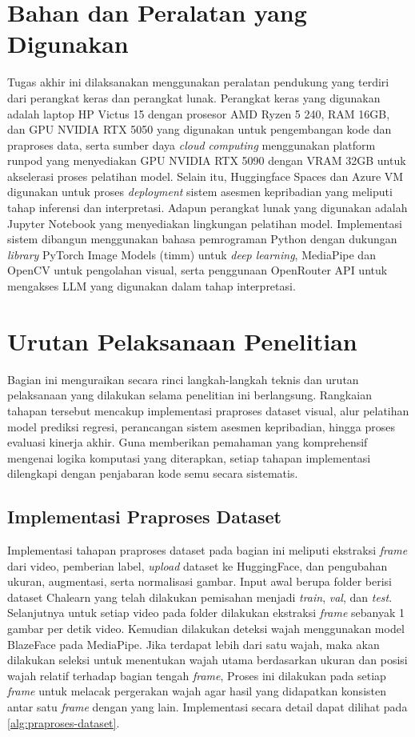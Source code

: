 \section{Bahan dan Peralatan yang Digunakan}

Tugas akhir ini dilaksanakan menggunakan peralatan pendukung yang terdiri dari perangkat keras dan perangkat lunak. Perangkat keras yang digunakan adalah laptop HP Victus 15 dengan prosesor AMD Ryzen 5 240, RAM 16GB, dan GPU NVIDIA RTX 5050 yang digunakan untuk pengembangan kode dan praproses data, serta sumber daya \textit{cloud computing} menggunakan platform runpod yang menyediakan GPU NVIDIA RTX 5090 dengan VRAM 32GB untuk akselerasi proses pelatihan model. Selain itu, Huggingface Spaces dan Azure VM digunakan untuk proses \textit{deployment} sistem asesmen kepribadian yang meliputi tahap inferensi dan interpretasi. Adapun perangkat lunak yang digunakan adalah Jupyter Notebook yang menyediakan lingkungan pelatihan model. Implementasi sistem dibangun menggunakan bahasa pemrograman Python dengan dukungan \textit{library} PyTorch Image Models (timm) untuk \textit{deep learning}, MediaPipe dan OpenCV untuk pengolahan visual, serta penggunaan OpenRouter API untuk mengakses LLM yang digunakan dalam tahap interpretasi.

\section{Urutan Pelaksanaan Penelitian}

Bagian ini menguraikan secara rinci langkah-langkah teknis dan urutan pelaksanaan yang dilakukan selama penelitian ini berlangsung. Rangkaian tahapan tersebut mencakup implementasi praproses dataset visual, alur pelatihan model prediksi regresi, perancangan sistem asesmen kepribadian, hingga proses evaluasi kinerja akhir. Guna memberikan pemahaman yang komprehensif mengenai logika komputasi yang diterapkan, setiap tahapan implementasi dilengkapi dengan penjabaran kode semu secara sistematis.

\subsection{Implementasi Praproses Dataset}

Implementasi tahapan praproses dataset pada bagian ini meliputi ekstraksi \textit{frame} dari video, pemberian label, \textit{upload} dataset ke HuggingFace, dan pengubahan ukuran, augmentasi, serta normalisasi gambar. Input awal berupa folder berisi dataset Chalearn yang telah dilakukan pemisahan menjadi \textit{train}, \textit{val}, dan \textit{test}. Selanjutnya untuk setiap video pada folder dilakukan ekstraksi \textit{frame} sebanyak 1 gambar per detik video. Kemudian dilakukan deteksi wajah menggunakan model BlazeFace pada MediaPipe. Jika terdapat lebih dari satu wajah, maka akan dilakukan seleksi untuk menentukan wajah utama berdasarkan ukuran dan posisi wajah relatif terhadap bagian tengah \textit{frame}, Proses ini dilakukan pada setiap \textit{frame} untuk melacak pergerakan wajah agar hasil yang didapatkan konsisten antar satu \textit{frame} dengan yang lain. Implementasi secara detail dapat dilihat pada \autoref{alg:praproses-dataset}.  

